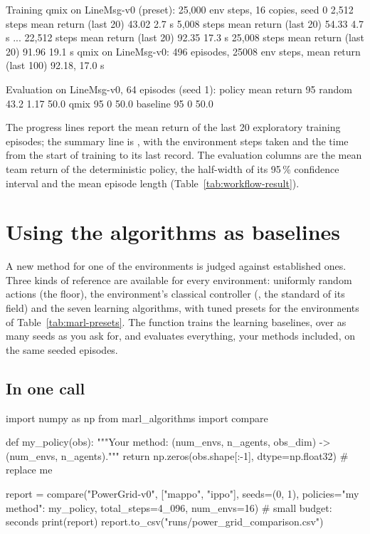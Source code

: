 \begin{textcode}
Training qmix on LineMsg-v0 (preset): 25,000 env steps, 16 copies, seed 0
       2,512 steps  mean return (last 20)        43.02     2.7 s
       5,008 steps  mean return (last 20)        54.33     4.7 s
       ...
      22,512 steps  mean return (last 20)        92.35    17.3 s
      25,008 steps  mean return (last 20)        91.96    19.1 s
qmix on LineMsg-v0: 496 episodes, 25008 env steps, mean return (last 100) 92.18, 17.0 s

Evaluation on LineMsg-v0, 64 episodes (seed 1):
  policy       mean return   95%
  random              43.2        1.17     50.0
  qmix                  95           0     50.0
  baseline              95           0     50.0
\end{textcode}

The progress lines report the mean return of the last 20 exploratory training
episodes; the summary line is , with the
environment steps taken and the time from the start of training to its last
record. The evaluation columns
are the mean team return of the deterministic policy, the half-width of its
95\,\% confidence interval and the mean episode length
(Table~\ref{tab:workflow-result}).

\section{Using the algorithms as baselines}\label{sec:marl-baselines}

A new method for one of the environments is judged against established ones.
Three kinds of reference are available for every environment: uniformly
random actions (the floor), the environment's classical controller
(, the standard of its field) and the seven
learning algorithms, with tuned presets for the environments of
Table~\ref{tab:marl-presets}. The function 
trains the learning baselines, over as many seeds as you ask for, and
evaluates everything, your methods included, on the same seeded episodes.

\subsection{In one call}

\begin{pycode}
import numpy as np
from marl_algorithms import compare

def my_policy(obs):
    """Your method: (num_envs, n_agents, obs_dim) -> (num_envs, n_agents)."""
    return np.zeros(obs.shape[:-1], dtype=np.float32)   # replace me

report = compare("PowerGrid-v0", ["mappo", "ippo"], seeds=(0, 1),
                 policies={"my method": my_policy},
                 total_steps=4_096, num_envs=16)       # small budget: seconds
print(report)
report.to_csv("runs/power_grid_comparison.csv")
\end{pycode}

